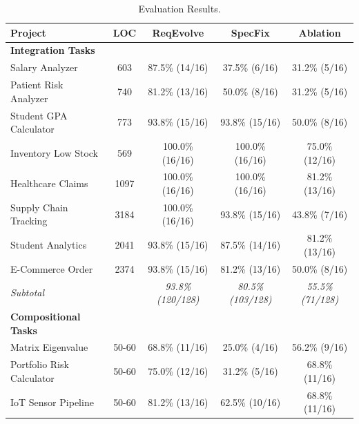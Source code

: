 \documentclass[sigconf,screen]{acmart}
\begin{document}
\begin{table}[!t]
\centering
\setlength{\tabcolsep}{0.7pt}
\caption{Evaluation  Results.
}
\label{tab:results}
\footnotesize
\begin{tabular}{lcccc}
\toprule
\textbf{Project} & \textbf{LOC} & \textbf{ReqEvolve} & \textbf{SpecFix} & \textbf{Ablation} \\
\midrule
\textbf{Integration Tasks} & & & & \\
\hspace{3pt}Salary Analyzer & 603 & 87.5\% (14/16) & 37.5\% (6/16) & 31.2\% (5/16) \\
\hspace{3pt}Patient Risk Analyzer & 740 & 81.2\% (13/16) & 50.0\% (8/16) & 31.2\% (5/16) \\
\hspace{3pt}Student GPA Calculator & 773 & 93.8\% (15/16) & 93.8\% (15/16) & 50.0\% (8/16) \\
\hspace{3pt}Inventory Low Stock & 569 & 100.0\% (16/16) & 100.0\% (16/16) & 75.0\% (12/16) \\
\hspace{3pt}Healthcare Claims & 1097 & 100.0\% (16/16) & 100.0\% (16/16) & 81.2\% (13/16) \\
\hspace{3pt}Supply Chain Tracking & 3184 & 100.0\% (16/16) & 93.8\% (15/16) & 43.8\% (7/16) \\
\hspace{3pt}Student Analytics & 2041 & 93.8\% (15/16) & 87.5\% (14/16) & 81.2\% (13/16) \\
\hspace{3pt}E-Commerce Order & 2374 & 93.8\% (15/16) & 81.2\% (13/16) & 50.0\% (8/16) \\
\hspace{3pt}\textit{Subtotal} & & \textit{93.8\% (120/128)} & \textit{80.5\% (103/128)} & \textit{55.5\% (71/128)} \\
\midrule
\textbf{Compositional Tasks} & & & & \\
\hspace{3pt}Matrix Eigenvalue & 50-60 & 68.8\% (11/16) & 25.0\% (4/16) & 56.2\% (9/16) \\
\hspace{3pt}Portfolio Risk Calculator & 50-60 & 75.0\% (12/16) & 31.2\% (5/16) & 68.8\% (11/16) \\
\hspace{3pt}IoT Sensor Pipeline & 50-60 & 81.2\% (13/16) & 62.5\% (10/16) & 68.8\% (11/16) \\

\end{tabular}
\end{table}
\end{document}

